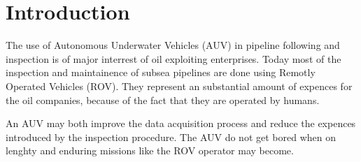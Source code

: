 \chapter{Introduction}

	The use of Autonomous Underwater Vehicles (AUV) in pipeline following and inspection is of major interrest of oil exploiting enterprises. Today most of the inspection and maintainence of subsea pipelines are done using Remotly Operated Vehicles (ROV). They represent an substantial amount of expences for the oil companies, because of the fact that they are operated by humans. 
	
	An AUV may both improve the data acquisition process and reduce the expences introduced by the inspection procedure. The AUV do not get bored when on lenghty and enduring missions like the ROV operator may become. 
	

